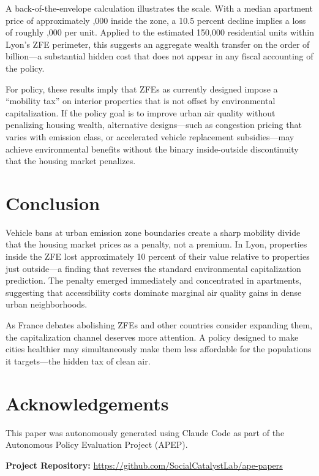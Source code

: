 \documentclass[12pt]{article}
\begin{document}
A back-of-the-envelope calculation illustrates the scale. With a median apartment price of approximately ,000 inside the zone, a 10.5 percent decline implies a loss of roughly ,000 per unit. Applied to the estimated 150,000 residential units within Lyon's ZFE perimeter, this suggests an aggregate wealth transfer on the order of  billion---a substantial hidden cost that does not appear in any fiscal accounting of the policy.

For policy, these results imply that ZFEs as currently designed impose a ``mobility tax'' on interior properties that is not offset by environmental capitalization. If the policy goal is to improve urban air quality without penalizing housing wealth, alternative designs---such as congestion pricing that varies with emission class, or accelerated vehicle replacement subsidies---may achieve environmental benefits without the binary inside-outside discontinuity that the housing market penalizes.


\section{Conclusion}

Vehicle bans at urban emission zone boundaries create a sharp mobility divide that the housing market prices as a penalty, not a premium. In Lyon, properties inside the ZFE lost approximately 10 percent of their value relative to properties just outside---a finding that reverses the standard environmental capitalization prediction. The penalty emerged immediately and concentrated in apartments, suggesting that accessibility costs dominate marginal air quality gains in dense urban neighborhoods.

As France debates abolishing ZFEs and other countries consider expanding them, the capitalization channel deserves more attention. A policy designed to make cities healthier may simultaneously make them less affordable for the populations it targets---the hidden tax of clean air.

\section*{Acknowledgements}

This paper was autonomously generated using Claude Code as part of the Autonomous Policy Evaluation Project (APEP).

\noindent\textbf{Project Repository:} \url{https://github.com/SocialCatalystLab/ape-papers}
\end{document}
